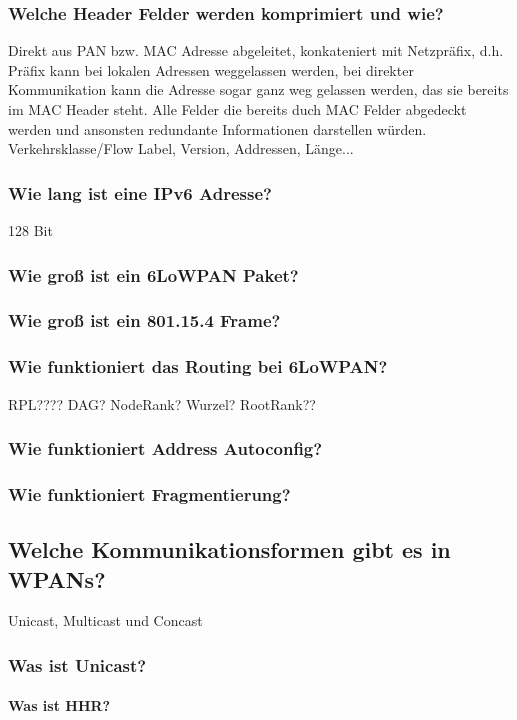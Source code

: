 		\subsubsection{Welche Header Felder werden komprimiert und wie?}
		Direkt aus PAN bzw. MAC\- Adresse abgeleitet, konkateniert mit Netzpräfix, d.h. Präfix kann bei lokalen Adressen weggelassen werden, bei direkter Kommunikation kann die Adresse sogar ganz weg gelassen werden, das sie bereits im MAC\- Header steht.
		Alle Felder die bereits duch MAC Felder abgedeckt werden und ansonsten redundante Informationen darstellen würden.
		Verkehrsklasse/Flow Label, Version, Addressen, Länge...
		
		\subsubsection{Wie lang ist eine IPv6\- Adresse?}
		128 Bit
		\subsubsection{Wie groß ist ein 6LoWPAN Paket?}
		\subsubsection{Wie groß ist ein 801.15.4 Frame?}
		
		\subsubsection{Wie funktioniert das Routing bei 6LoWPAN?}
		RPL???? DAG? NodeRank? Wurzel? RootRank??
		\subsubsection{Wie funktioniert Address Autoconfig?}
		\subsubsection{Wie funktioniert Fragmentierung?}
	
	\subsection{Welche Kommunikationsformen gibt es in WPANs?}
		Unicast, Multicast und Concast
		\subsubsection{Was ist Unicast?}
			\paragraph{Was ist HHR?}
